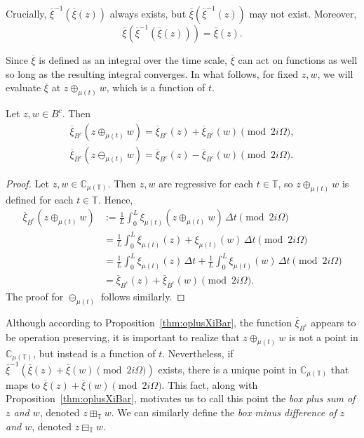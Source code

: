 \documentclass[reqno]{amsart}
\begin{document}
Crucially, $\overline{\xi}^{-1}(\overline{\xi}(z))$ always exists, but $\overline{\xi}(\overline{\xi}^{-1}(z))$ may not
exist. Moreover,
$$
\overline{\xi}(\overline{\xi}^{-1}(\overline{\xi}(z))) = \overline{\xi}(z).
$$

Since $\overline{\xi}$ is defined as an integral over the time scale, $\overline{\xi}$ can act on
functions as well so long as the resulting integral converges. In what follows,
for fixed $z,w$, we will evaluate $\overline{\xi}$ at $z \oplus_{\mu(t)} w$, which is a
function of $t$.

\begin{proposition}
\label{thm:oplusXiBar}
Let $z,w \in B^c$.
Then
 \begin{gather*}
 \overline{\xi}_{B^c}(z \oplus_{\mu(t)} w) = \overline{\xi}_{B^c}(z) + \overline{\xi}_{B^c}(w) \pmod{ 2i \Omega},\\%
 \overline{\xi}_{B^c}(z \ominus_{\mu(t)} w) = \overline{\xi}_{B^c}(z) - \overline{\xi}_{B^c}(w) \pmod{2 i \Omega}. %
 \end{gather*}
\end{proposition}

\begin{proof}
Let $z,w \in \mathbb{C}_{\mu(\mathbb{T})}$. Then $z,w$ are regressive for each $t \in \mathbb{T}$, so
$z \oplus_{\mu(t)} w$ is defined for each $t \in \mathbb{T}$. Hence,
 \begin{align*}
 \overline{\xi}_{B^c}(z \oplus_{\mu(t)} w)
 & := \frac{1}{L} \int_{0}^{L} \xi_{\mu(t)}(z \oplus_{\mu(t)} w)\,\Delta t \pmod{2 i \Omega}\\
 & = \frac{1}{L}\int_{0}^{L} \xi_{\mu(t)}(z) + \xi_{\mu(t)}(w)\,\Delta t \pmod{2 i \Omega} \\
 & = \frac{1}{L}\int_{0}^{L} \xi_{\mu(t)}(z) \,\Delta t + \frac{1}{L}\int_{0}^{L} \xi_{\mu(t)}(w)\,\Delta t \pmod{2 i \Omega}\\
 & = \overline{\xi}_{B^c}(z) + \overline{\xi}_{B^c}(w) \pmod{2 i \Omega}.
 \end{align*}
The proof for $\ominus_{\mu(t)}$ follows similarly.
\end{proof}

Although according to Proposition~\ref{thm:oplusXiBar}, the function
$\overline{\xi}_{B^c}$ appears to be operation preserving, it is important to realize that
$z \oplus_{\mu(t)} w$ is not a point in $\mathbb{C}_{\mu(\mathbb{T})}$, but instead is a function of $t$.
Nevertheless, if $\overline{\xi}^{-1}(\overline{\xi}(z) + \overline{\xi}(w) \pmod{2 i \Omega})$ exists, there
is a unique point in $\mathbb{C}_{\mu(\mathbb{T})}$ that maps to
$\overline{\xi}(z) + \overline{\xi}(w) \pmod {2 i \Omega} $. This fact, along with
Proposition~\ref{thm:oplusXiBar}, motivates us to call this point the \emph{box plus
sum of $z$ and $w$}, denoted $z \boxplus_{\mathbb{T}} w$. We can similarly define the
\emph{box minus difference of $z$ and $w$}, denoted $z \boxminus_{\mathbb{T}} w$.
\end{document}
